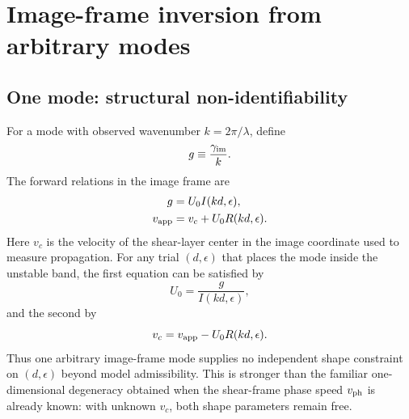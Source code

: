 \documentclass[linenumbers]{aastex7}
\begin{document}
\section{Image-frame inversion from arbitrary modes}
\subsection{One mode: structural non-identifiability}
For a mode with observed wavenumber $k=2\pi/\lambda$, define
\begin{equation}
g\equiv\frac{\gamma_{\rm im}}{k}.
\end{equation}
The forward relations in the image frame are
\begin{align}
g &= U_0 I(kd,\epsilon),\\
v_{\rm app} &= v_c+U_0R(kd,\epsilon).
\end{align}
Here $v_c$ is the velocity of the shear-layer center in the image coordinate used to measure propagation. For any trial $(d,\epsilon)$ that places the mode inside the unstable band, the first equation can be satisfied by
\begin{equation}
U_0=\frac{g}{I(kd,\epsilon)},
\end{equation}
and the second by
\begin{equation}
v_c=v_{\rm app}-U_0R(kd,\epsilon).
\end{equation}
Thus one arbitrary image-frame mode supplies no independent shape constraint on $(d,\epsilon)$ beyond model admissibility. This is stronger than the familiar one-dimensional degeneracy obtained when the shear-frame phase speed $v_{\rm ph}$ is already known: with unknown $v_c$, both shape parameters remain free.
\end{document}
